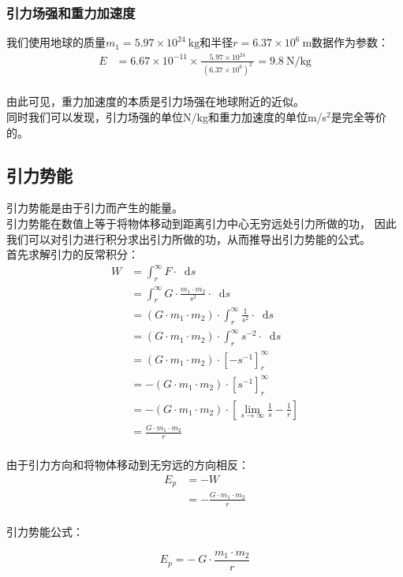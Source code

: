 \documentclass[UTF8]{ctexart}
\newcommand*{\dif}{\mathop{}\!\mathrm{d}}
\begin{document}
\subsubsection{引力场强和重力加速度}
    我们使用地球的质量$m_1=5.97\times 10^{24}~\text{kg}$和半径$r=6.37\times 10^6~\text{m}$数据作为参数：\vspace{5pt}
    \setcounter{equation}{0}
    \begin{align}
        E&=6.67\times 10^{-11}\times\frac{5.97\times 10^{24}}{~\left(6.37\times 10^{6}\right)^2~}=9.8~\text{N/kg}
    \end{align}\\
    由此可见，重力加速度的本质是引力场强在地球附近的近似。\\[3mm]
    同时我们可以发现，引力场强的单位N/kg和重力加速度的单位m/s$^2$是完全等价的。

\newpage
        
\subsection{引力势能}
    引力势能是由于引力而产生的能量。\\[3mm]
    引力势能在数值上等于将物体移动到距离引力中心无穷远处引力所做的功，
    因此我们可以对引力进行积分求出引力所做的功，从而推导出引力势能的公式。\\[5mm]
    首先求解引力的反常积分：
    \setcounter{equation}{0}
    \begin{align}    
        W&=\int_{r}^{\infty} F\cdot\dif s\\[3mm]
        &= \int_{r}^{\infty} G \cdot \frac{m_{1} \cdot m_{2}}{{s}^{2}}\cdot\dif s \\[3mm]
        &=(G \cdot m_{1} \cdot m_{2}) \cdot \int_{r}^{\infty} \frac{1}{{s}^{2}}\cdot\dif s \\[3mm]
        &=(G \cdot m_{1} \cdot m_{2}) \cdot \int_{r}^{\infty} {s}^{-2}\cdot\dif s \\[3mm]
        &=(G \cdot m_{1} \cdot m_{2})\cdot\left[-{s}^{-1}\right]_{r}^{\infty} \\[4mm]
        &=-(G \cdot m_{1} \cdot m_{2})\cdot\left[{s}^{-1}\right]_{r}^{\infty} \\[3mm]
        &=-(G \cdot m_{1} \cdot m_{2})\cdot\left[\lim_{s\to\infty}\frac{1}{s}-\frac{1}{r}\right] \\[3mm]
        &=\frac{G\cdot m_{1}\cdot m_{2}}{r}
    \end{align}\\
    由于引力方向和将物体移动到无穷远的方向相反：\vspace{3pt}
    \begin{align}
        E_p
        &=-W\\[4mm]
        &=-\frac{G\cdot m_{1}\cdot m_{2}}{r}
    \end{align}\\
    引力势能公式：
    \begin{large}
        \begin{equation*}
            E_{p} = -\ G \cdot \dfrac{m_{1} \cdot m_{2}}{r}
        \end{equation*}
    \end{large}
\end{document}
